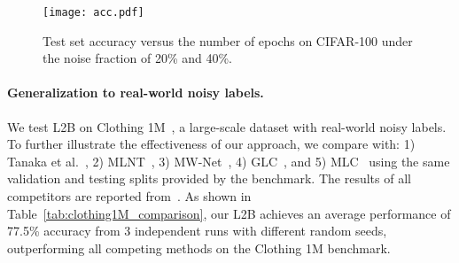 \documentclass{article}
\begin{document}
\begin{figure}[tbh!]
        \centering
        \texttt{[image: acc.pdf]}
        \vspace{-1em}
        \caption{Test set accuracy versus the number of epochs on CIFAR-100 under the noise fraction of 20\%  and 40\%.}
        \vspace{-1em}
        \label{fig:accuracy_comparison}
\end{figure}



\paragraph{Generalization to real-world noisy labels.} 
We test L2B on Clothing 1M~\cite{xiao2015learning}, a large-scale dataset with real-world noisy labels. 
To further illustrate the effectiveness of our approach, we compare with:  1) Tanaka et al.~\cite{tanaka2018joint}, 2) MLNT~\cite{li2019learning}, 3) MW-Net~\cite{shu2019meta}, 4) GLC~\cite{hendrycks2018using}, and 5) MLC~\cite{zheng2021meta} using the same validation and testing splits provided by the benchmark.
The results of all competitors are reported from~\cite{zheng2021meta}.
As shown in Table~\ref{tab:clothing1M_comparison}, our L2B achieves an average performance of 77.5\% accuracy from 3 independent runs with different random seeds, outperforming all competing methods on the Clothing 1M benchmark.


\begin{table*}[h!]
\centering
\caption{Comparison with state-of-the-art methods in test accuracy (\%) under real-world noise on Clothing 1M. Our results are reported from 3 independent runs with different random seeds. All other results are reported from~\cite{zheng2021meta}.}
\label{tab:clothing1M_comparison}
\vspace{-.5em}
\vspace{-1em}
\end{table*}
\end{document}
